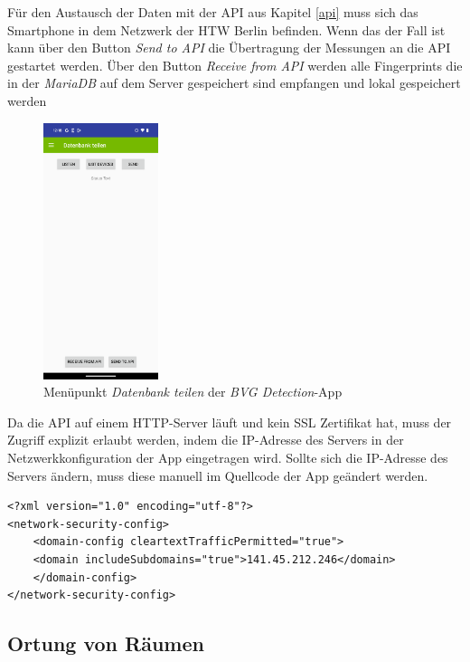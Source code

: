 Für den Austausch der Daten mit der API aus Kapitel \ref{api} muss sich das Smartphone in dem Netzwerk der HTW Berlin befinden. Wenn das der Fall ist kann über den Button \textit{Send to API} die Übertragung der Messungen an die API gestartet werden. Über den Button \textit{Receive from API} werden alle Fingerprints die in der \textit{MariaDB} auf dem Server gespeichert sind empfangen und lokal gespeichert werden 

\begin{figure}[h]
    \centering
    \includegraphics[width=0.3\textwidth]{images/screenshots/share_database.png}
    \caption{Menüpunkt \textit{Datenbank teilen} der \textit{BVG Detection}-App}
    \label{fig:bvg_detection_share_database}
\end{figure}

Da die API auf einem HTTP-Server läuft und kein SSL Zertifikat hat, muss der Zugriff explizit erlaubt werden, indem die IP-Adresse des Servers in der Netzwerkkonfiguration der App eingetragen wird. Sollte sich die IP-Adresse des Servers ändern, muss diese manuell im Quellcode der App geändert werden.

\begin{lstlisting}[caption={Netzwerkkonfiguration der App}]
<?xml version="1.0" encoding="utf-8"?>
<network-security-config>
    <domain-config cleartextTrafficPermitted="true">
    <domain includeSubdomains="true">141.45.212.246</domain>
    </domain-config>
</network-security-config>    
\end{lstlisting}

\subsection{Ortung von Räumen}

